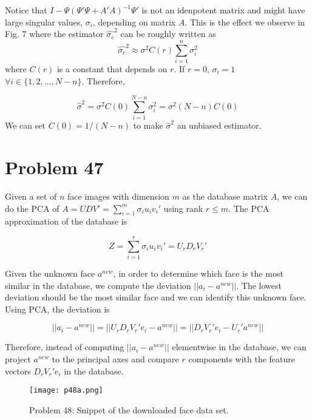 \documentclass[a4paper, 11pt]{article}
\begin{document}
Notice that $I - \Psi\left(\Psi'\Psi + A'A \right)^{-1}\Psi'$ is not an idenpotent matrix and might have large singular values, $\sigma_i$, depending on matrix $A$. This is the effect we observe in Fig. 7 where the estimator $\hat{\sigma_c}^2$ can be roughly written as
\begin{equation}
\hat{\sigma_c}^2 \approx \sigma^2 C(r)\sum_{i=1}^n \sigma_i^2
\end{equation}
where $C(r)$ is a constant that depends on $r$. If $r = 0$, $\sigma_i = 1$ $\forall i \in \{1,2,\dots, N-n \}$. Therefore, 

\begin{equation}
\hat{\sigma}^2 = \sigma^2 C(0)\sum_{i=1}^{N-n} \sigma_i^2 = \sigma^2(N-n)C(0)
\end{equation}
We can set $C(0) = 1/(N-n)$ to make $\hat{\sigma}^2$ an unbiased estimator. 



\section*{Problem 47}


Given a set of $n$ face images with dimension $m$ as the database matrix $A$, we can do the PCA of $A = UDV' = \sum_{i=1}^m \sigma_iu_iv_i'$ using rank $r\leq m$. The PCA approximation of the database is 

\begin{equation}
Z = \sum_{i=1}^r \sigma_iu_iv_i' = U_rD_rV_r'
\end{equation}

Given the unknown face $a^{new}$, in order to determine which face is the most similar in the database, we compute the deviation $||a_i - a^{new}||$. The lowest deviation should be the most similar face and we can identify this unknown face. Using PCA, the deviation is

\begin{equation}
||a_i - a^{new}|| = ||U_rD_rV_r'e_i - a^{new}|| = ||D_rV_r'e_i - U_r'a^{new}||
\end{equation}

Therefore, instead of computing $||a_i - a^{new}||$ elementwise in the database, we can project $a^{new}$ to the principal axes and compare $r$ components with the feature vectors $D_rV_r'e_i$ in the database. 

\begin{figure}
	\begin{center}
		\texttt{[image: p48a.png]}
		\caption{Problem 48: Snippet of the downloaded face data set. }
	\end{center}
\end{figure}
\end{document}

